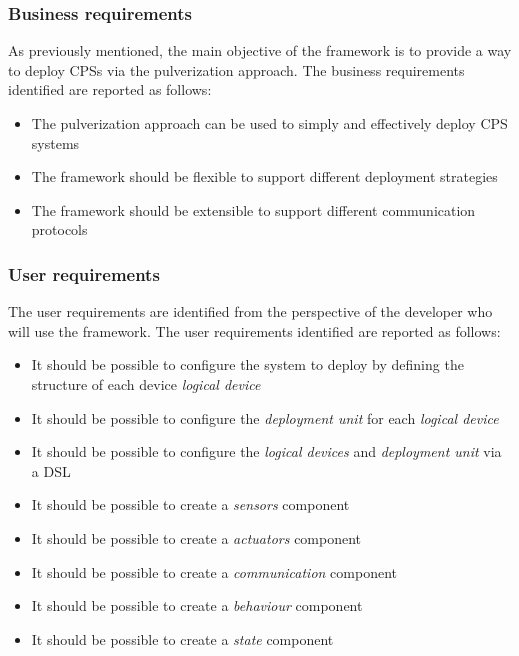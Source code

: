 \subsubsection{Business requirements}
\label{sec:business-requirements}

As previously mentioned, the main objective of the framework is to provide a way to deploy CPSs via the pulverization approach.
The business requirements identified are reported as follows:

\begin{itemize}
	\item The pulverization approach can be used to simply and effectively deploy CPS systems
	\item The framework should be flexible to support different deployment strategies
	\item The framework should be extensible to support different communication protocols
\end{itemize}

\subsubsection{User requirements}
\label{sec:user-requirements}

The user requirements are identified from the perspective of the developer who will use the framework.
The user requirements identified are reported as follows:

\begin{itemize}
	\item It should be possible to configure the system to deploy by defining the structure of each device \emph{logical device}
	\item It should be possible to configure the \emph{deployment unit} for each \emph{logical device}
	\item It should be possible to configure the \emph{logical devices} and \emph{deployment unit} via a DSL
	\item It should be possible to create a \emph{sensors} component
	\item It should be possible to create a \emph{actuators} component
	\item It should be possible to create a \emph{communication} component
	\item It should be possible to create a \emph{behaviour} component
	\item It should be possible to create a \emph{state} component
\end{itemize}

